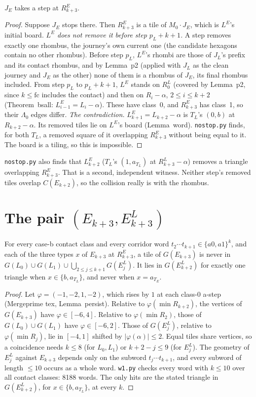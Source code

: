 \documentclass[11pt]{article}
\theoremstyle{remark}\newtheorem{remark}[theorem]{Remark}
\begin{document}
\begin{proposition}[no stop at $R^E_{k+3}$]\label{prop:nostop}
$J_E$ takes a step at $R^E_{k+3}$.
\end{proposition}
\begin{proof}
Suppose $J_E$ stops there. Then $R^E_{k+3}$ is a tile of $M_0\cdot J_E$, which is $L^E$'s initial board.
\emph{$L^E$ does not remove it before step $p_L+k+1$.} A step removes exactly one rhombus, the journey's own current one (the candidate hexagons contain no other rhombus). Before step $p_L$, $L^E$'s rhombi are those of $J_L$'s prefix and its contact rhombus, and by Lemma~p2 (applied with $J_L$ as the clean journey and $J_E$ as the other) none of them is a rhombus of $J_E$, its final rhombus included. From step $p_L$ to $p_L+k+1$, $L^E$ stands on $R^L_0$ (covered by Lemma~p2, since $k\le\mathrm{fc}$ includes the contact) and then on $R_i-\alpha$, $2\le i\le k+2$ (Theorem~bsall: $L^E_{i-1}=L_i-\alpha$). These have class~0, and $R^E_{k+3}$ has class~1, so their $\Lambda_0$ edges differ.
\emph{The contradiction.} $L^E_{k+1}=L_{k+2}-\alpha$ is $T_L$'s $(0,b)$ at $R_{k+2}-\alpha$. Its removed tiles lie on $L^E$'s board (Lemma~word). \texttt{nostop.py} finds, for both $T_L$, a removed square of it overlapping $R^E_{k+3}$ without being equal to it. The board is a tiling, so this is impossible.
\end{proof}
\noindent\texttt{nostop.py} also finds that $L^E_{k+2}$ ($T_L$'s $(1,a_{T_L})$ at $R^L_{k+3}-\alpha$) removes a triangle overlapping $R^E_{k+3}$. That is a second, independent witness. Neither step's removed tiles overlap $C(E_{k+2})$, so the collision really is with the rhombus.

\section{The pair $(E_{k+3},E^L_{k+3})$}
\begin{lemma}\label{lem:w1}
For every case-b contact class and every corridor word $t_2\cdots t_{k+1}\in\{a0,a1\}^k$, and each of the three types $x$ of $E_{k+3}$ at $R^E_{k+3}$, a tile of $G(E_{k+3})$ is never in $G(L_0)\cup G(L_1)\cup\bigcup_{2\le j\le k+1}G(E^L_j)$. It lies in $G(E^L_{k+2})$ for exactly one triangle when $x\in\{b,a_{T_L}\}$, and never when $x=a_{T_E}$.
\end{lemma}
\begin{proof}
Let $\varphi=(-1,-2,1,-2)$, which rises by $1$ at each class-0 a-step (Mergeprime tex, Lemma~persist). Relative to $\varphi(\min R_{k+2})$, the vertices of $G(E_{k+3})$ have $\varphi\in[-6,4]$. Relative to $\varphi(\min R_2)$, those of $G(L_0)\cup G(L_1)$ have $\varphi\in[-6,2]$. Those of $G(E^L_j)$, relative to $\varphi(\min R_j)$, lie in $[-4,1]$ shifted by $|\varphi(\alpha)|\le2$. Equal tiles share vertices, so a coincidence needs $k\le8$ (for $L_0,L_1$) or $k+2-j\le9$ (for $E^L_j$). The geometry of $E^L_j$ against $E_{k+3}$ depends only on the subword $t_j\cdots t_{k+1}$, and every subword of length $\le10$ occurs as a whole word. \texttt{w1.py} checks every word with $k\le10$ over all contact classes: 8188 words. The only hits are the stated triangle in $G(E^L_{k+2})$, for $x\in\{b,a_{T_L}\}$, at every $k$.
\end{proof}
\end{document}
